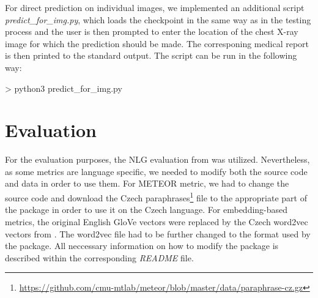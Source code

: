 For direct prediction on individual images, we implemented an additional script \textit{predict\_for\_img.py}, which loads the checkpoint in the same way as in the testing process and the user is then prompted to enter the location of the chest X-ray image for which the prediction should be made. The corresponing medical report is then printed to the standard output. The script can be run in the following way:
\begin{code}
> python3 predict_for_img.py
\end{code}

\section{Evaluation}
For the evaluation purposes, the NLG evaluation from \citet{sharma2017nlgeval} was utilized. Nevertheless, as some metrics are language specific, we needed to modify both the source code and data in order to use them. For METEOR metric, we had to change the source code and download the Czech paraphrases\footnote[6]{\url{https://github.com/cmu-mtlab/meteor/blob/master/data/paraphrase-cz.gz}} file to the appropriate part of the package in order to use it on the Czech language. For embedding-based metrics, the original English GloVe vectors were replaced by the Czech word2vec vectors from \citet{grave2018learning}. The word2vec file had to be further changed to the format used by the package. All neccessary information on how to modify the package is described within the corresponding \textit{README} file.
